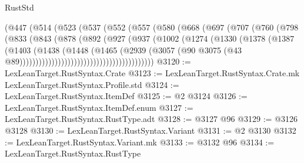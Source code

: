 \begin{lexlean}{RustStd}
\begin{coremodule}
                          (@447
                            (@514
                              (@523
                                (@537
                                  (@552
                                    (@557
                                      (@580
                                        (@668
                                          (@697
                                            (@707
                                              (@760
                                                (@798
                                                  (@833
                                                    (@843
                                                      (@878
                                                        (@892
                                                          (@927
                                                            (@937
                                                              (@1002
                                                                (@1274
                                                                  (@1330
                                                                    (@1378
                                                                      (@1387
                                                                        (@1403
                                                                          (@1438
                                                                            (@1448
                                                                              (@1465
                                                                                (@2939
                                                                                  (@3057
                                                                                    (@90
                                                                                      @3075
                                                                                      (@43
                                                                                        @89))))))))))))))))))))))))))))))))))))))))))
@3120 := LexLeanTarget.RustSyntax.Crate
@3123 := LexLeanTarget.RustSyntax.Crate.mk LexLeanTarget.RustSyntax.Profile.std
@3124 := LexLeanTarget.RustSyntax.ItemDef
@3125 := @2 @3124
@3126 := LexLeanTarget.RustSyntax.ItemDef.enum
@3127 := LexLeanTarget.RustSyntax.RustType.adt
@3128 := @3127 @96
@3129 := @3126 @3128
@3130 := LexLeanTarget.RustSyntax.Variant
@3131 := @2 @3130
@3132 := LexLeanTarget.RustSyntax.Variant.mk
@3133 := @3132 @96
@3134 := LexLeanTarget.RustSyntax.RustType

\end{coremodule}
\end{lexlean}
